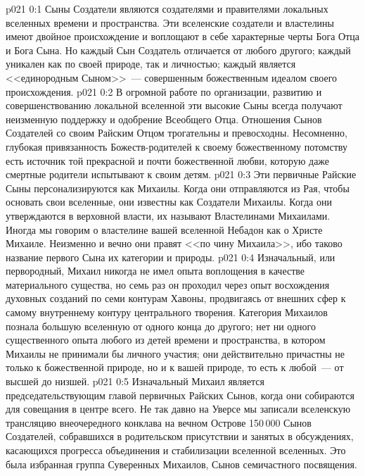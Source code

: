 \author{Совершенствователь Мудрости}
\vs p021 0:1 Сыны Создатели являются создателями и правителями локальных вселенных времени и пространства. Эти вселенские создатели и властелины имеют двойное происхождение и воплощают в себе характерные черты Бога Отца и Бога Сына. Но каждый Сын Создатель отличается от любого другого; каждый уникален как по своей природе, так и личностью; каждый является <<единородным Сыном>>~--- совершенным божественным идеалом своего происхождения.
\vs p021 0:2 В огромной работе по организации, развитию и совершенствованию локальной вселенной эти высокие Сыны всегда получают неизменную поддержку и одобрение Всеобщего Отца. Отношения Сынов Создателей со своим Райским Отцом трогательны и превосходны. Несомненно, глубокая привязанность Божеств\hyp{}родителей к своему божественному потомству есть источник той прекрасной и почти божественной любви, которую даже смертные родители испытывают к своим детям.
\vs p021 0:3 Эти первичные Райские Сыны персонализируются как Михаилы. Когда они отправляются из Рая, чтобы основать свои вселенные, они известны как Создатели Михаилы. Когда они утверждаются в верховной власти, их называют Властелинами Михаилами. Иногда мы говорим о властелине вашей вселенной Небадон как о Христе Михаиле. Неизменно и вечно они правят <<по чину Михаила>>, ибо таково название первого Сына их категории и природы.
\vs p021 0:4 \pc Изначальный, или первородный, Михаил никогда не имел опыта воплощения в качестве материального существа, но семь раз он проходил через опыт восхождения духовных созданий по семи контурам Хавоны, продвигаясь от внешних сфер к самому внутреннему контуру центрального творения. Категория Михаилов познала большую вселенную от одного конца до другого; нет ни одного существенного опыта любого из детей времени и пространства, в котором Михаилы не принимали бы личного участия; они действительно причастны не только к божественной природе, но и к вашей природе, то есть к любой~--- от высшей до низшей.
\vs p021 0:5 Изначальный Михаил является председательствующим главой первичных Райских Сынов, когда они собираются для совещания в центре всего. Не так давно на Уверсе мы записали вселенскую трансляцию внеочередного конклава на вечном Острове 150\,000 Сынов Создателей, собравшихся в родительском присутствии и занятых в обсуждениях, касающихся прогресса объединения и стабилизации вселенной вселенных. Это была избранная группа Суверенных Михаилов, Сынов семичастного посвящения.
